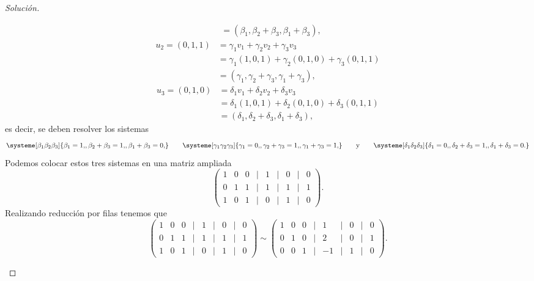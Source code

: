 \documentclass[a4,11pt]{aleph-notas}
\begin{document}
\begin{proof}[Solución]
\begin{enumerate}[leftmargin=*]
\begin{align*}
        & = (\beta_1,\beta_2+\beta_3,\beta_1+\beta_3),
    \end{align*}
    \begin{align*}
        u_2 = (0,1,1) 
        & = \gamma_1 v_1+\gamma_2v_2+\gamma_3v_3 \\
        & = \gamma_1 (1,0,1) +\gamma_2(0,1,0) +\gamma_3(0,1,1)\\
        & = (\gamma_1,\gamma_2+\gamma_3,\gamma_1+\gamma_3),
    \end{align*}
    \begin{align*}
        u_3 = (0,1,0) 
        & = \delta_1 v_1+\delta_2v_2+\delta_3v_3 \\
        & = \delta_1 (1,0,1) +\delta_2(0,1,0) +\delta_3(0,1,1)\\
        & = (\delta_1,\delta_2+\delta_3,\delta_1+\delta_3),
    \end{align*}
    es decir, se deben resolver los sistemas
    \[
        \systeme[\beta_1\beta_2\beta_3]{
        \beta_1 = 1{,},
        \beta_2+\beta_3 = 1{,},
        \beta_1+\beta_3 = 0{,}
        }
        \qquad
        \systeme[\gamma_1\gamma_2\gamma_3]{
        \gamma_1 = 0{,},
        \gamma_2+\gamma_3 = 1{,},
        \gamma_1+\gamma_3 = 1{,}
        }
        \texty
        \systeme[\delta_1\delta_2\delta_3]{
        \delta_1 = 0{,},
        \delta_2+\delta_3 = 1{,},
        \delta_1+\delta_3 = 0{.}
        }
    \]
    Podemos colocar estos tres sistemas en una matriz ampliada
    \[
        \begin{pmatrix}
            1 & 0 & 0 & | & 1 & | & 0 & | & 0\\
            0 & 1 & 1 & | & 1 & | & 1 & | & 1\\
            1 & 0 & 1 & | & 0 & | & 1 & | & 0
        \end{pmatrix}.
    \]
    Realizando reducción por filas tenemos que
    \[
        \begin{pmatrix}
            1 & 0 & 0 & | & 1 & | & 0 & | & 0\\
            0 & 1 & 1 & | & 1 & | & 1 & | & 1\\
            1 & 0 & 1 & | & 0 & | & 1 & | & 0
        \end{pmatrix}
        \sim
        \begin{pmatrix}
            1 & 0 & 0 & | &  1 & | & 0 & | & 0\\
            0 & 1 & 0 & | &  2 & | & 0 & | & 1\\
            0 & 0 & 1 & | & -1 & | & 1 & | & 0
        \end{pmatrix}.
\]
\end{enumerate}
\end{proof}
\end{document}
